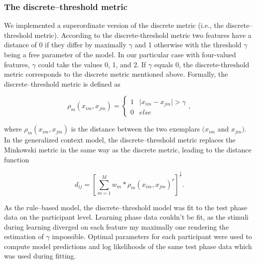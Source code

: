 \documentclass[a4paper,man,natbib]{apa6}
\begin{document}
\subsubsection{The discrete--threshold metric}
We implemented a superordinate version of the discrete metric (i.e., the discrete--threshold metric). According to the discrete-threshold metric two features have a distance of 0 if they differ by maximally $\gamma$ and 1 otherwise with the threshold $\gamma$ being a free parameter of the model. In our particular case with four-valued features, $\gamma$ could take the values 0, 1, and 2. If $\gamma$ equals 0, the discrete-threshold metric corresponds to the discrete metric mentioned above. Formally, the discrete--threshold metric is defined as

\begin{equation}
\rho_{m}(x_{im}, x_{jm}) = 
\begin{cases}
	1 & \mid x_{im} - x_{jm} \mid > \gamma \\
	0 & else 
\end{cases},
\end{equation}

where $\rho_{m}(x_{im}, x_{jm})$ is the distance between the two exemplars $(x_{im}$ and $x_{jm})$. In the generalized context model, the discrete--threshold metric replaces the Minkowski metric in the same way as the discrete metric, leading to the distance function

\begin{equation}
d_{ij} = \left[\sum\limits_{m=1}^M w_{m}* \rho_{m}(x_{im}, x_{jm}) ^r\right]^\frac{1}{r}.
\end{equation}

As the rule--based model, the discrete--threshold model was fit to the test phase data on the participant level. Learning phase data couldn't be fit, as the stimuli during learning diverged on each feature my maximally one rendering the estimation of $\gamma$ impossible. Optimal parameters for each participant were used to compute model predictions and log likelihoods of the same test phase data which was used during fitting. 
\end{document}
